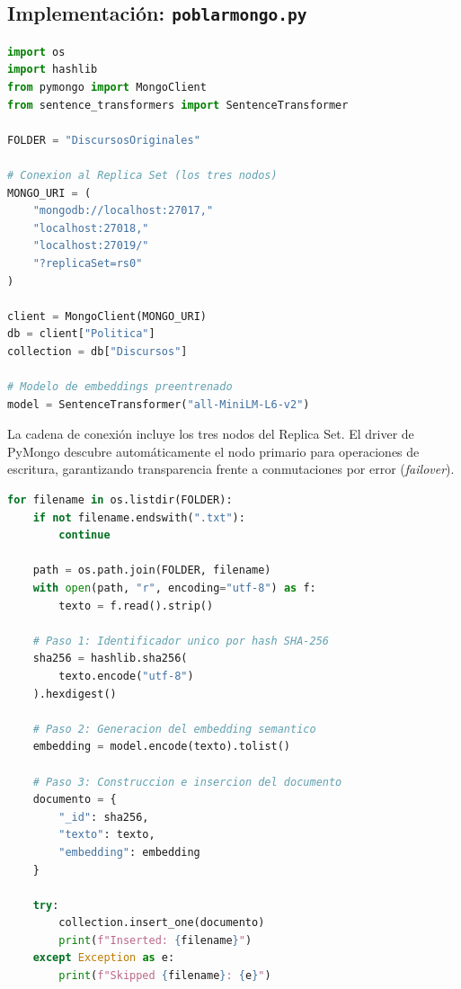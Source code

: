 \documentclass[12pt,a4paper]{article}
\begin{document}
\subsection{Implementación: \texttt{poblarmongo.py}}

\begin{lstlisting}[style=pythonstyle, language=Python,
    caption={Configuración de conexión al Replica Set y carga del modelo},
    label={lst:conexion}]
import os
import hashlib
from pymongo import MongoClient
from sentence_transformers import SentenceTransformer

FOLDER = "DiscursosOriginales"

# Conexion al Replica Set (los tres nodos)
MONGO_URI = (
    "mongodb://localhost:27017,"
    "localhost:27018,"
    "localhost:27019/"
    "?replicaSet=rs0"
)

client = MongoClient(MONGO_URI)
db = client["Politica"]
collection = db["Discursos"]

# Modelo de embeddings preentrenado
model = SentenceTransformer("all-MiniLM-L6-v2")
\end{lstlisting}

La cadena de conexión incluye los tres nodos del Replica Set. El driver de PyMongo descubre automáticamente el nodo primario para operaciones de escritura, garantizando transparencia frente a conmutaciones por error (\textit{failover}).

\begin{lstlisting}[style=pythonstyle, language=Python,
    caption={Pipeline de procesamiento e inserción por documento},
    label={lst:pipeline}]
for filename in os.listdir(FOLDER):
    if not filename.endswith(".txt"):
        continue

    path = os.path.join(FOLDER, filename)
    with open(path, "r", encoding="utf-8") as f:
        texto = f.read().strip()

    # Paso 1: Identificador unico por hash SHA-256
    sha256 = hashlib.sha256(
        texto.encode("utf-8")
    ).hexdigest()

    # Paso 2: Generacion del embedding semantico
    embedding = model.encode(texto).tolist()

    # Paso 3: Construccion e insercion del documento
    documento = {
        "_id": sha256,
        "texto": texto,
        "embedding": embedding
    }

    try:
        collection.insert_one(documento)
        print(f"Inserted: {filename}")
    except Exception as e:
        print(f"Skipped {filename}: {e}")
\end{lstlisting}
\end{document}
